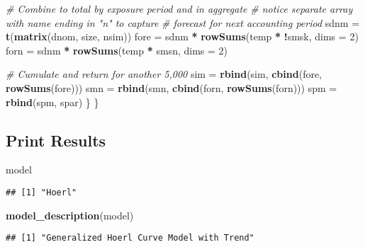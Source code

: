 \documentclass[]{article}
\newenvironment{Shaded}{\begin{snugshade}}{\end{snugshade}}
\newcommand{\CommentTok}[1]{\textcolor[rgb]{0.56,0.35,0.01}{\textit{#1}}}
\newcommand{\DataTypeTok}[1]{\textcolor[rgb]{0.13,0.29,0.53}{#1}}
\newcommand{\DecValTok}[1]{\textcolor[rgb]{0.00,0.00,0.81}{#1}}
\newcommand{\KeywordTok}[1]{\textcolor[rgb]{0.13,0.29,0.53}{\textbf{#1}}}
\newcommand{\NormalTok}[1]{#1}
\newcommand{\OperatorTok}[1]{\textcolor[rgb]{0.81,0.36,0.00}{\textbf{#1}}}
\newcommand{\StringTok}[1]{\textcolor[rgb]{0.31,0.60,0.02}{#1}}
\begin{document}
\begin{Shaded}
\begin{Highlighting}[]
    \CommentTok{# Combine to total by exposure period and in aggregate}
    \CommentTok{# notice separate array with name ending in "n" to capture}
    \CommentTok{# forecast for next accounting period}
\NormalTok{    sdnm =}\StringTok{ }\KeywordTok{t}\NormalTok{(}\KeywordTok{matrix}\NormalTok{(dnom, size, nsim))}
\NormalTok{    fore =}\StringTok{ }\NormalTok{sdnm }\OperatorTok{*}\StringTok{ }\KeywordTok{rowSums}\NormalTok{(temp }\OperatorTok{*}\StringTok{ }\OperatorTok{!}\NormalTok{smsk, }\DataTypeTok{dims =} \DecValTok{2}\NormalTok{)}
\NormalTok{    forn =}\StringTok{ }\NormalTok{sdnm }\OperatorTok{*}\StringTok{ }\KeywordTok{rowSums}\NormalTok{(temp }\OperatorTok{*}\StringTok{ }\NormalTok{smsn, }\DataTypeTok{dims =} \DecValTok{2}\NormalTok{)}

    \CommentTok{# Cumulate and return for another 5,000}
\NormalTok{    sim =}\StringTok{ }\KeywordTok{rbind}\NormalTok{(sim, }\KeywordTok{cbind}\NormalTok{(fore, }\KeywordTok{rowSums}\NormalTok{(fore)))}
\NormalTok{    smn =}\StringTok{ }\KeywordTok{rbind}\NormalTok{(smn, }\KeywordTok{cbind}\NormalTok{(forn, }\KeywordTok{rowSums}\NormalTok{(forn)))}
\NormalTok{    spm =}\StringTok{ }\KeywordTok{rbind}\NormalTok{(spm, spar)}
\NormalTok{  \}}
\NormalTok{\}}
\end{Highlighting}
\end{Shaded}

\hypertarget{print-results}{%
\subsection{Print Results}\label{print-results}}

\begin{Shaded}
\begin{Highlighting}[]
\NormalTok{model}
\end{Highlighting}
\end{Shaded}

\begin{verbatim}
## [1] "Hoerl"
\end{verbatim}

\begin{Shaded}
\begin{Highlighting}[]
\KeywordTok{model_description}\NormalTok{(model)}
\end{Highlighting}
\end{Shaded}

\begin{verbatim}
## [1] "Generalized Hoerl Curve Model with Trend"
\end{verbatim}
\end{document}
